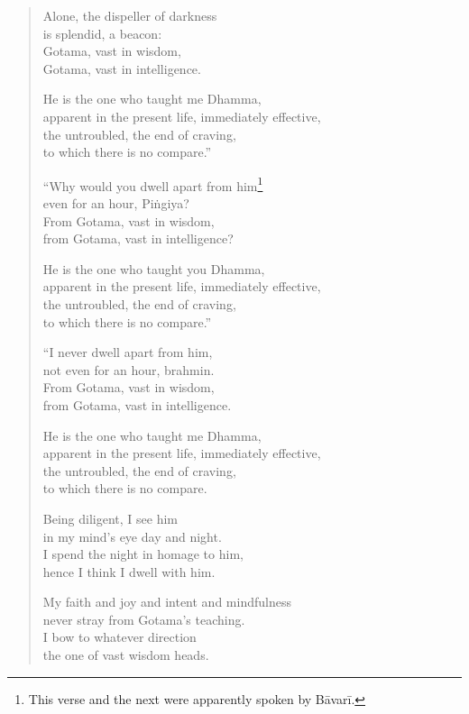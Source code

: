 \documentclass[12pt,openany]{book}%
\begin{document}
\begin{verse}
Alone, the dispeller of darkness \\
is splendid, a beacon: \\
Gotama, vast in wisdom, \\
Gotama, vast in intelligence. 

He is the one who taught me Dhamma, \\
apparent in the present life, immediately effective, \\
the untroubled, the end of craving, \\
to which there is no compare.” 

“Why would you dwell apart from him\footnote{This verse and the next were apparently spoken by \textsanskrit{Bāvarī}. } \\
even for an hour, \textsanskrit{Piṅgiya}? \\
From Gotama, vast in wisdom, \\
from Gotama, vast in intelligence? 

He is the one who taught you Dhamma, \\
apparent in the present life, immediately effective, \\
the untroubled, the end of craving, \\
to which there is no compare.” 

“I never dwell apart from him, \\
not even for an hour, brahmin. \\
From Gotama, vast in wisdom, \\
from Gotama, vast in intelligence. 

He is the one who taught me Dhamma, \\
apparent in the present life, immediately effective, \\
the untroubled, the end of craving, \\
to which there is no compare. 

Being diligent, I see him \\
in my mind’s eye day and night. \\
I spend the night in homage to him, \\
hence I think I dwell with him. 

My faith and joy and intent and mindfulness \\
never stray from Gotama’s teaching. \\
I bow to whatever direction \\
the one of vast wisdom heads. 


\end{verse}
\end{document}
